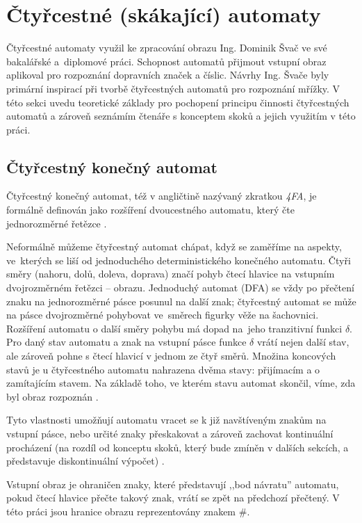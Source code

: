 \section{Čtyřcestné (skákající) automaty}

Čtyřcestné automaty využil ke zpracování obrazu Ing. Dominik Švač ve své bakalářské \cite{BakalarkaSvac} a~diplomové \cite{DiplomkaSvac} práci. Schopnost automatů přijmout vstupní obraz aplikoval pro rozpoznání dopravních značek a číslic. Návrhy Ing. Švače byly primární inspirací při tvorbě čtyřcestných automatů pro rozpoznání mřížky. V této sekci uvedu teoretické základy pro pochopení principu činnosti čtyřcestných automatů a zároveň seznámím čtenáře s konceptem skoků a jejich využitím v této práci.

\subsection*{Čtyřcestný konečný automat}
Čtyřcestný konečný automat, též v angličtině nazývaný zkratkou \emph{4FA}, je formálně definován jako rozšíření dvoucestného automatu, který čte jednorozměrné řetězce \cite{RozenbergGrzegorz1997HoFL}. 

Neformálně můžeme čtyřcestný automat chápat, když se zaměříme na aspekty, ve~kterých se liší od jednoduchého deterministického konečného automatu. Čtyři směry (nahoru, dolů, doleva, doprava) značí pohyb čtecí hlavice na vstupním dvojrozměrném řetězci -- obrazu. Jednoduchý automat (DFA) se vždy po přečtení znaku na jednorozměrné pásce posunul na další znak; čtyřcestný automat se může na pásce dvojrozměrné pohybovat ve~směrech figurky věže na šachovnici. Rozšíření automatu o další směry pohybu má dopad na~jeho tranzitivní funkci $\delta$.
Pro daný stav automatu a znak na vstupní pásce funkce $\delta$ vrátí nejen další stav, ale zároveň pohne s čtecí hlavicí v jednom ze čtyř směrů. Množina koncových stavů je u čtyřcestného automatu nahrazena dvěma stavy: přijímacím a o
zamítajícím stavem. Na základě toho, ve kterém stavu automat skončil, víme, zda byl obraz rozpoznán \cite{RozenbergGrzegorz1997HoFL}.

Tyto vlastnosti umožňují automatu vracet se k již navštíveným znakům na vstupní pásce, nebo určité znaky přeskakovat a zároveň zachovat kontinuální procházení (na rozdíl od konceptu skoků, který bude zmíněn v dalších sekcích, a představuje diskontinuální výpočet) \cite{MedunaFormalLang}. 

Vstupní obraz je ohraničen znaky, které představují ,,bod návratu'' automatu, pokud čtecí hlavice přečte takový znak, vrátí se zpět na předchozí přečtený. V této práci jsou hranice obrazu reprezentovány znakem $\#$.

